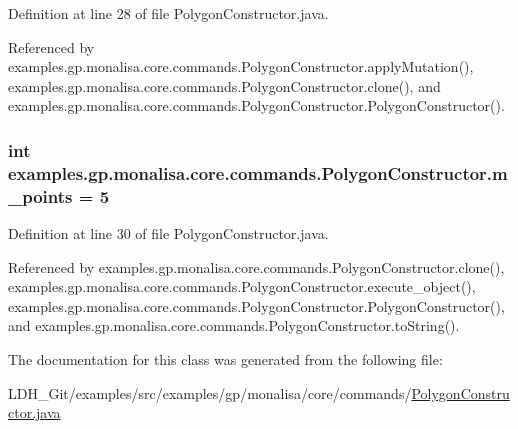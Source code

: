 Definition at line 28 of file Polygon\-Constructor.\-java.



Referenced by examples.\-gp.\-monalisa.\-core.\-commands.\-Polygon\-Constructor.\-apply\-Mutation(), examples.\-gp.\-monalisa.\-core.\-commands.\-Polygon\-Constructor.\-clone(), and examples.\-gp.\-monalisa.\-core.\-commands.\-Polygon\-Constructor.\-Polygon\-Constructor().

\hypertarget{classexamples_1_1gp_1_1monalisa_1_1core_1_1commands_1_1_polygon_constructor_a6268c0c301220754af8428f3e8cadfc2}{
\subsubsection[{m\-\_\-points}]{\setlength{\rightskip}{0pt plus 5cm}int examples.\-gp.\-monalisa.\-core.\-commands.\-Polygon\-Constructor.\-m\-\_\-points = 5\hspace{0.3cm}{\ttfamily [private]}}}\label{classexamples_1_1gp_1_1monalisa_1_1core_1_1commands_1_1_polygon_constructor_a6268c0c301220754af8428f3e8cadfc2}


Definition at line 30 of file Polygon\-Constructor.\-java.



Referenced by examples.\-gp.\-monalisa.\-core.\-commands.\-Polygon\-Constructor.\-clone(), examples.\-gp.\-monalisa.\-core.\-commands.\-Polygon\-Constructor.\-execute\-\_\-object(), examples.\-gp.\-monalisa.\-core.\-commands.\-Polygon\-Constructor.\-Polygon\-Constructor(), and examples.\-gp.\-monalisa.\-core.\-commands.\-Polygon\-Constructor.\-to\-String().



The documentation for this class was generated from the following file\-:\begin{DoxyCompactItemize}
\item 
L\-D\-H\-\_\-\-Git/examples/src/examples/gp/monalisa/core/commands/\hyperlink{_polygon_constructor_8java}{Polygon\-Constructor.\-java}\end{DoxyCompactItemize}
